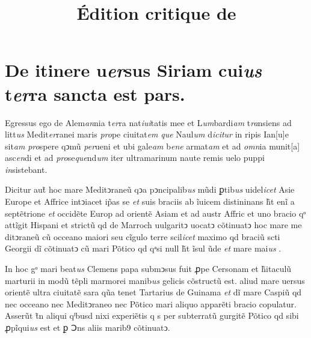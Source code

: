 \documentclass[12pt, a4paper]{book}
\newcommand{\styleabbr}[1]{\textit{#1}}
\begin{document}
			\title{Édition critique de}
			\maketitle
		
			\beginnumbering
			
	
	
	  
	    
	      
	    
	    
	      \chapter{
		De itinere u\styleabbr{er}sus Siriam cui\styleabbr{us} t\styleabbr{er}ra sancta est pars.
	      }
	      
	\pstart
	
		Egressus ego de Alem\styleabbr{an}nia t\styleabbr{er}ra nat\styleabbr{iui}tatis mee
		et L\styleabbr{um}bardi\styleabbr{am} t\styleabbr{ra}nsiens ad litt\styleabbr{us} Medit\styleabbr{er}ranei maris
		\styleabbr{pro}pe ciuitat\styleabbr{em} \styleabbr{que} Naul\styleabbr{um} d\styleabbr{icitur}
		in ripis Ian[u]e sit\styleabbr{am} \styleabbr{pro}spere qↄmũ \styleabbr{per}ueni et ubi gale\styleabbr{am} 
		b\styleabbr{ene} armat\styleabbr{am} et ad \styleabbr{omn}ia munit[a] asc\styleabbr{en}di
		et ad \styleabbr{pro}se\styleabbr{que}nd\styleabbr{um} iter ultramarinum
		naute remis uelo puppi \styleabbr{in}sistebant.
	      
	\pend
	
	      
	\pstart
	
		Dicitur aut̃ hoc mare Meditↄraneũ
		qↄa pↄncipalib\styleabbr{us} mũdi ꝑtib\styleabbr{us} uidel\styleabbr{icet} Asie Europe et Affrice intↄiacet ip̃as se \styleabbr{et}
		suis braciis ab ĩuicem distininans h̃t enĩ a septẽtrione \styleabbr{et} occidẽte Europ\styleabbr{}
		ad orientẽ Asiam et ad austr\styleabbr{} Affric\styleabbr{} et uno  bracio qᵒ attĩgit Hispani\styleabbr{}
		et strictũ qd  de Marroch uulgaritↄ uocatↄ cõtinuatↄ hoc mare me
		ditↄraneũ cũ occeano maiori seu cĩgulo terre scil\styleabbr{icet} maximo qd braciũ s\styleabbr{}cti
		Georgii dĩ cõtinuatↄ cũ mari Põtico qd qᵃsi null\styleabbr{} h̃t ĩsul\styleabbr{} ũde \styleabbr{et} mare mai\styleabbr{us} .
	      
	\pend
	
	      
	\pstart
	
		In hoc gᵒ mari beat\styleabbr{us} Clemens papa submↄsus fuit ꝓpe Cersonam
		et h̃itaculũ marturii in modũ tẽpli marmorei manib\styleabbr{us} \styleabbr{}gelicis cõstructũ est.
		 aliud mare uersus orientẽ ultra ciuitatẽ sara qũa tenet Tartarius
		de Guinama \styleabbr{et} dĩ mare Caspiũ qd nec occeano nec Meditↄraneo nec Põtico mari
		aliquo apparẽti bracio copulatur. Asserũt t̃n aliqui qⁱbusd\styleabbr{} nixi experiẽtis
		q s per subterratũ gurgitẽ Põtico qd sibi ꝓpĩqui\styleabbr{us} est et ꝑ Ↄns aliis marib9
		cõtinuatↄ.
				
\end{document}
